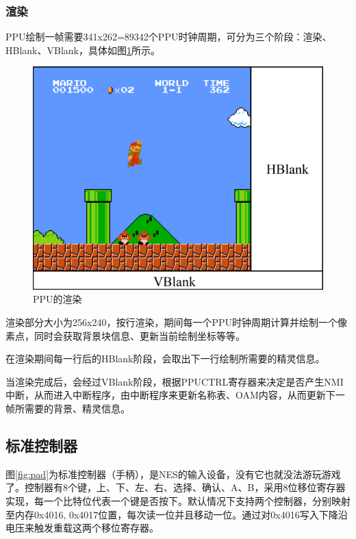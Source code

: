 \documentclass[a4paper]{ltxdoc}
\begin{document}
{\subsubsection{渲染}
PPU绘制一帧需要341x262=89342个PPU时钟周期，可分为三个阶段：渲染、HBlank、VBlank，具体如图\ref{fig:rendering}所示。
\begin{figure}[h]
	\centering
	\includegraphics[width=\textwidth]{images/vblank_hblank.png}
	\caption{PPU的渲染}
	\label{fig:rendering}
\end{figure}

渲染部分大小为256x240，按行渲染，期间每一个PPU时钟周期计算并绘制一个像素点，同时会获取背景块信息、更新当前绘制坐标等等\cite{ppurendering}。

在渲染期间每一行后的HBlank阶段，会取出下一行绘制所需要的精灵信息。\cite{evalsprite}

当渲染完成后，会经过VBlank阶段，根据PPUCTRL寄存器来决定是否产生NMI中断，从而进入中断程序，由中断程序来更新名称表、OAM内容，从而更新下一帧所需要的背景、精灵信息。

\subsection{标准控制器}
图\ref{fig:pad}为标准控制器（手柄），是NES的输入设备，没有它也就没法游玩游戏了。控制器有8个键，上、下、左、右、选择、确认、A、B，采用8位移位寄存器实现，每一个比特位代表一个键是否按下。默认情况下支持两个控制器，分别映射至内存0x4016, 0x4017位置，每次读一位并且移动一位。通过对0x4016写入下降沿电压来触发重载这两个移位寄存器。

}
\end{document}
